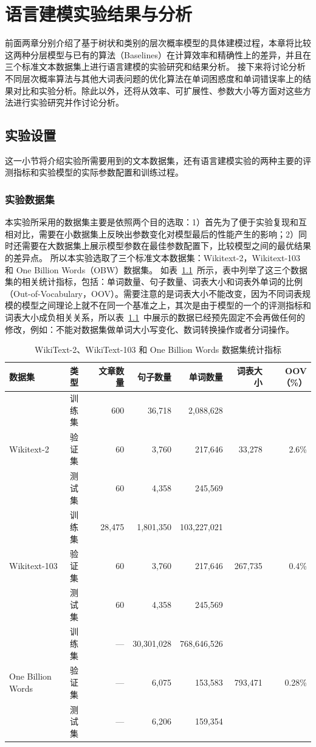 
\chapter{语言建模实验结果与分析}
前面两章分别介绍了基于树状和类别的层次概率模型的具体建模过程，本章将比较这两种分层模型与已有的算法（Baselines）在计算效率和精确性上的差异，并且在三个标准文本数据集上进行语言建模的实验研究和结果分析。
接下来将讨论分析不同层次概率算法与其他大词表问题的优化算法在单词困惑度和单词错误率上的结果对比和实验分析。除此以外，还将从效率、可扩展性、参数大小等方面对这些方法进行实验研究并作讨论分析。

\section{实验设置}
这一小节将介绍实验所需要用到的文本数据集，还有语言建模实验的两种主要的评测指标和实验模型的实际参数配置和训练过程。
\subsection{实验数据集}
本实验所采用的数据集主要是依照两个目的选取：1）首先为了便于实验复现和互相对比，需要在小数据集上反映出参数变化对模型最后的性能产生的影响；2）同时还需要在大数据集上展示模型参数在最佳参数配置下，比较模型之间的最优结果的差异点。
所以本实验选取了三个标准文本数据集：Wikitext-2，Wikitext-103 和 One Billion Words（OBW）数据集。
如表~\ref{tab:dataset}~所示，表中列举了这三个数据集的相关统计指标，包括：单词数量、句子数量、词表大小和词表外单词的比例（Out-of-Vocabulary，OOV）。需要注意的是词表大小不能改变，因为不同词表规模的模型之间理论上就不在同一个基准之上，其次是由于模型的一个的评测指标和词表大小成负相关关系，所以表~\ref{tab:dataset}~中展示的数据已经预先固定不会再做任何的修改，例如：不能对数据集做单词大小写变化、数词转换操作或者分词操作。
\begin{table}[!ht]
  \centering
  \caption{WikiText-2、WikiText-103 和 One Billion Words 数据集统计指标 \label{tab:dataset}}
\begin{tabular}{llrrrrr}
\toprule
数据集& 类型& 文章数量  & 句子数量 & 单词数量 & 词表大小 & OOV（\%） \\ \midrule
\multirow{3}{*}{Wikitext-2} &训练集& 600 & 36,718 & 2,088,628 & \multirow{3}{*}{33,278} & \multirow{3}{*}{2.6\%} \\
&验证集& 60 &3,760 & 217,646  & &\\
&测试集& 60 & 4,358 & 245,569 & &\\
\midrule
\multirow{3}{*}{Wikitext-103} &训练集& 28,475 &  1,801,350 &  103,227,021 & \multirow{3}{*}{267,735} & \multirow{3}{*}{0.4\%} \\
&验证集& 60 &3,760 & 217,646  & &\\
&测试集& 60 & 4,358 & 245,569 & &\\
\midrule
\multirow{3}{*}{One Billion Words} &训练集& --- &30,301,028&768,646,526&   \multirow{3}{*}{793,471} &   \multirow{3}{*}{0.28\%} \\
 &验证集& --- &  6,075 &   153,583 &&\\
 &测试集 & --- &  6,206 &   159,354 &&\\
\bottomrule
\end{tabular}
\end{table}

